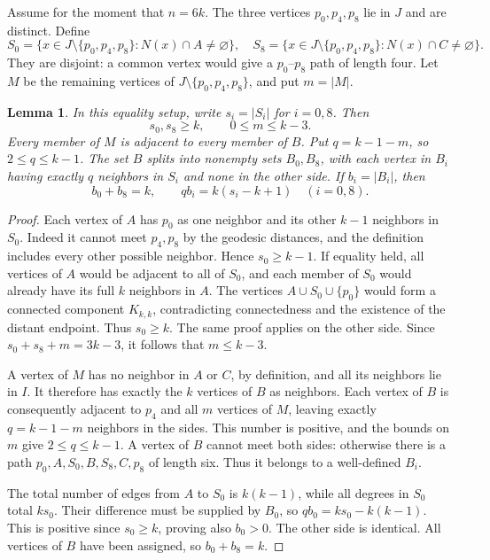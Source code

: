 \documentclass[11pt]{article}
\newtheorem{lemma}[theorem]{Lemma}
\begin{document}
Assume for the moment that $n=6k$. The three vertices $p_0,p_4,p_8$
lie in $J$ and are distinct. Define
\[
 S_0=\{x\in J\setminus\{p_0,p_4,p_8\}:N(x)\cap A\ne\varnothing\},
 \quad
 S_8=\{x\in J\setminus\{p_0,p_4,p_8\}:N(x)\cap C\ne\varnothing\}.
\]
They are disjoint: a common vertex would give a $p_0$--$p_8$ path
of length four. Let $M$ be the remaining vertices of
$J\setminus\{p_0,p_4,p_8\}$, and put $m=|M|$.

\begin{lemma}\label{balance}
In this equality setup, write $s_i=|S_i|$ for $i=0,8$. Then
\[
 s_0,s_8\geq k,\qquad 0\leq m\leq k-3.
\]
Every member of $M$ is adjacent to every member of $B$. Put
$q=k-1-m$, so $2\leq q\leq k-1$. The set $B$ splits into nonempty
sets $B_0,B_8$, with each vertex in $B_i$ having exactly $q$ neighbors
in $S_i$ and none in the other side. If $b_i=|B_i|$, then
\begin{equation}\label{balanceeq}
 b_0+b_8=k,\qquad q b_i=k(s_i-k+1)\quad(i=0,8).
\end{equation}
\end{lemma}
\begin{proof}
Each vertex of $A$ has $p_0$ as one neighbor and its other $k-1$
neighbors in $S_0$. Indeed it cannot meet $p_4,p_8$ by the geodesic
distances, and the definition includes every other possible neighbor.
Hence $s_0\geq k-1$. If equality held, all vertices of $A$ would be
adjacent to all of $S_0$, and each member of $S_0$ would already have
its full $k$ neighbors in $A$. The vertices $A\cup S_0\cup\{p_0\}$
would form a connected component $K_{k,k}$, contradicting connectedness
and the existence of the distant endpoint. Thus $s_0\geq k$. The
same proof applies on the other side. Since
$s_0+s_8+m=3k-3$, it follows that $m\leq k-3$.

A vertex of $M$ has no neighbor in $A$ or $C$, by definition, and all
its neighbors lie in $I$. It therefore has exactly the $k$ vertices
of $B$ as neighbors. Each vertex of $B$ is consequently adjacent to
$p_4$ and all $m$ vertices of $M$, leaving exactly $q=k-1-m$ neighbors
in the sides. This number is positive, and the bounds on $m$ give
$2\leq q\leq k-1$. A vertex of $B$ cannot meet both sides: otherwise
there is a path $p_0,A,S_0,B,S_8,C,p_8$ of length six. Thus it belongs
to a well-defined $B_i$.

The total number of edges from $A$ to $S_0$ is $k(k-1)$, while all
degrees in $S_0$ total $ks_0$. Their difference must be supplied by
$B_0$, so $qb_0=ks_0-k(k-1)$. This is positive since $s_0\geq k$,
proving also $b_0>0$. The other side is identical. All vertices of
$B$ have been assigned, so $b_0+b_8=k$.
\end{proof}
\end{document}
